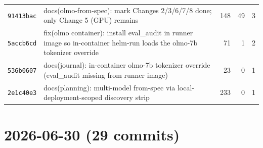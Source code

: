 \begin{longtable}{@{}p{}p{}r r r@{}}
\texttt{91413bac} & docs(olmo-from-spec): mark Changes 2/3/6/7/8 done; only Change 5 (GPU) remains & 148 & 49 & 3 \\
\texttt{5accb6cd} & fix(olmo container): install eval\_audit in runner image so in-container helm-run loads the olmo-7b tokenizer override & 71 & 1 & 2 \\
\texttt{536b0607} & docs(journal): in-container olmo-7b tokenizer override (eval\_audit missing from runner image) & 23 & 0 & 1 \\
\texttt{2e1c40e3} & docs(planning): multi-model from-spec via local-deployment-scoped discovery strip & 233 & 0 & 1 \\
\bottomrule\end{longtable}
\section*{2026-06-30 (29 commits)}
